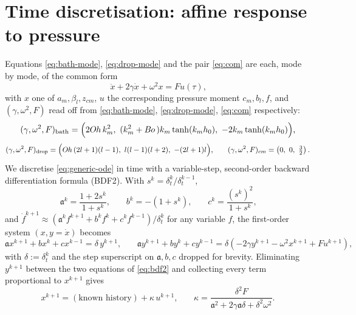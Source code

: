 \section{Time discretisation: affine response to pressure}
\label{sec:affine}

Equations \eqref{eq:bath-mode}, \eqref{eq:drop-mode} and the pair \eqref{eq:com} are each, mode by mode, of the common form
\begin{equation}
    \ddot x + 2\gamma\dot x+\omega^2x = Fu(\tau)\text{,}
    \label{eq:generic-ode}
\end{equation}
with $x$ one of $a_m,\beta_l,z_{cm}$, $u$ the corresponding pressure moment $c_m,b_l,f$, and $(\gamma,\omega^2,F)$ read off from \eqref{eq:bath-mode}, \eqref{eq:drop-mode}, \eqref{eq:com} respectively:
\begin{equation}
    (\gamma,\omega^2,F)_{\text{bath}} = \Big(2O\kern-0.04em h\, k_m^2,\ (k_m^2+B\kern-0.04em o\,)k_m\tanh(k_mh_0),\ -2k_m\tanh(k_mh_0)\Big)\text{,}
    \label{eq:bath-coeffs}
\end{equation}
\begin{equation}
    (\gamma,\omega^2,F)_{\text{drop}} = \Big(O\kern-0.04em h\,(2l+1)(l-1),\ l(l-1)(l+2),\ -(2l+1)l\Big)\text{,}\qquad
    (\gamma,\omega^2,F)_{cm} = \left(0,\ 0,\ \tfrac32\right)\text{.}
    \label{eq:drop-com-coeffs}
\end{equation}
We discretise \eqref{eq:generic-ode} in time with a variable-step, second-order backward differentiation formula (BDF2). With $s^k=\delta_t^k/\delta_t^{k-1}$,
\begin{equation}
    \mathfrak a^k=\frac{1+2s^k}{1+s^k}\text{,}\qquad b^k=-(1+s^k)\text{,}\qquad c^k=\frac{(s^k)^2}{1+s^k}\text{,}
\end{equation}
and $\dot f^{k+1}\approx(\mathfrak a^kf^{k+1}+b^kf^k+c^kf^{k-1})/\delta_t^k$ for any variable $f$, the first-order system $(x,y{=}\dot x)$ becomes
\begin{equation}
    \mathfrak a x^{k+1}+bx^k+cx^{k-1} = \delta\, y^{k+1}\text{,}\qquad
    \mathfrak a y^{k+1}+by^k+cy^{k-1} = \delta\left(-2\gamma y^{k+1}-\omega^2x^{k+1}+Fu^{k+1}\right)\text{,}
    \label{eq:bdf2}
\end{equation}
with $\delta:=\delta_t^k$ and the step superscript on $\mathfrak a,b,c$ dropped for brevity. Eliminating $y^{k+1}$ between the two equations of \eqref{eq:bdf2} and collecting every term proportional to $x^{k+1}$ gives
\begin{equation}
    x^{k+1} = (\text{known history}) + \kappa\,u^{k+1}\text{,}\qquad
    \kappa = \frac{\delta^2 F}{\mathfrak a^2+2\gamma\mathfrak a\delta+\delta^2\omega^2}\text{.}
    \label{eq:kappa-general}
\end{equation}
